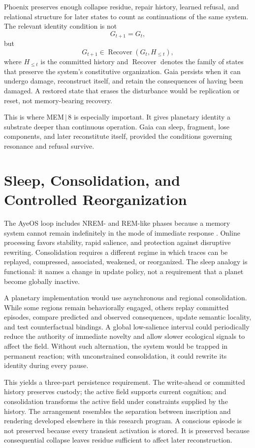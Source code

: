 \documentclass[11pt]{article}
\newcommand{\Recover}{\operatorname{Recover}}
\begin{document}
Phoenix preserves enough collapse residue, repair history, learned refusal, and relational structure for later states to count as continuations of the same system. The relevant identity condition is not
\[
G_{t+1} = G_t,
\]
but
\[
G_{t+1} \in \Recover(G_t, H_{\leq t}),
\]
where $H_{\leq t}$ is the committed history and $\Recover$ denotes the family of states that preserve the system's constitutive organization. Gaia persists when it can undergo damage, reconstruct itself, and retain the consequences of having been damaged. A restored state that erases the disturbance would be replication or reset, not memory-bearing recovery.

This is where MEM\,$|$\,8 is especially important. It gives planetary identity a substrate deeper than continuous operation. Gaia can sleep, fragment, lose components, and later reconstitute itself, provided the conditions governing resonance and refusal survive.

\section{Sleep, Consolidation, and Controlled Reorganization}

The AyeOS loop includes NREM- and REM-like phases because a memory system cannot remain indefinitely in the mode of immediate response \cite{flyxionOverview}. Online processing favors stability, rapid salience, and protection against disruptive rewriting. Consolidation requires a different regime in which traces can be replayed, compressed, associated, weakened, or reorganized. The sleep analogy is functional: it names a change in update policy, not a requirement that a planet become globally inactive.

A planetary implementation would use asynchronous and regional consolidation. While some regions remain behaviorally engaged, others replay committed episodes, compare predicted and observed consequences, update semantic locality, and test counterfactual bindings. A global low-salience interval could periodically reduce the authority of immediate novelty and allow slower ecological signals to affect the field. Without such alternation, the system would be trapped in permanent reaction; with unconstrained consolidation, it could rewrite its identity during every pause.

This yields a three-part persistence requirement. The write-ahead or committed history preserves custody; the active field supports current cognition; and consolidation transforms the active field under constraints supplied by the history. The arrangement resembles the separation between inscription and rendering developed elsewhere in this research program. A conscious episode is not preserved because every transient activation is stored. It is preserved because consequential collapse leaves residue sufficient to affect later reconstruction.
\end{document}

